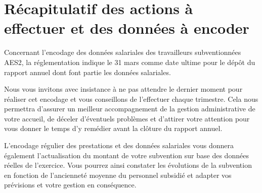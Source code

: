 \section{Récapitulatif des actions à effectuer et des données à encoder}


\begin{attention}\normalfont
Concernant l'encodage des données salariales des travailleurs subventionnées AES2, la réglementation indique le 31 mars comme date ultime pour le dépôt du rapport annuel dont font partie les données salariales. 
\end{attention}
Nous vous invitons avec insistance à ne pas attendre le dernier moment pour réaliser cet encodage et vous conseillons de l’effectuer chaque trimestre. 
Cela nous permettra d’assurer un meilleur accompagnement de la gestion administrative de votre accueil, de déceler d’éventuels problèmes et d’attirer votre attention pour vous donner le temps d’y remédier avant la clôture du rapport annuel. 

L’encodage régulier des prestations et des données salariales vous donnera également l’actualisation du montant de votre subvention sur base des données réelles de l’exercice. 
Vous pourrez ainsi constater les évolutions de la subvention en fonction de l’ancienneté moyenne du personnel subsidié et adapter vos prévisions et votre gestion en conséquence.






